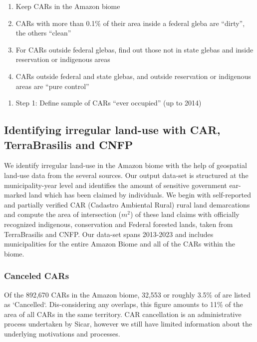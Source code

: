 \documentclass[12pt]{article}
\begin{document}
\begin{appendices}
\begin{enumerate}
    \item Keep CARs in the Amazon biome
    \item CARs with more than 0.1\% of their area inside a federal gleba are ``dirty'', the others ``clean''
    \item For CARs outside federal glebas, find out those not in state glebas and inside reservation or indigenous areas
    \item CARs outside federal and state glebas, and outside reservation or indigenous areas are ``pure control''
\end{enumerate}

 \begin{enumerate}
     \item Step 1: Define sample of CARs ``ever occupied'' (up to 2014)
 \end{enumerate}

\subsection{Identifying irregular land-use with CAR, TerraBrasilis and CNFP}
	
	We identify irregular land-use in the Amazon biome with the help of geospatial land-use data from the several sources. Our output data-set is structured at the municipality-year level and identifies the amount of sensitive government ear-marked land which has been claimed by individuals. We begin with self-reported and partially verified CAR (Cadastro Ambiental Rural) rural land demarcations and compute the area of intersection ($m^2$) of these land claims with officially recognized indigenous, conservation and Federal forested lands, taken from TerraBrasilis and CNFP. Our data-set spans 2013-2023 and includes municipalities for the entire Amazon Biome and all of the CARs within the biome. 


    \subsubsection{Canceled CARs}

    Of the 892,670  CARs in the Amazon biome, 32,553 or roughly 3.5\% of  are listed as `Cancelled`. Dis-considering any overlaps, this figure amounts to 11\% of the area of all CARs in the same territory. CAR cancellation is an administrative process undertaken by Sicar, however we still have limited information about the underlying motivations and processes.
    

\end{appendices}
\end{document}
